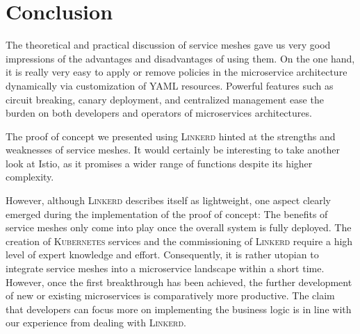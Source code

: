 \section{Conclusion}

The theoretical and practical discussion of service meshes gave us very good impressions of the advantages and disadvantages of using them.
On the one hand, it is really very easy to apply or remove policies in the microservice architecture dynamically via customization of YAML resources. Powerful features such as circuit breaking, canary deployment, and centralized management ease the burden on both developers and operators of microservices architectures.

The proof of concept we presented using \textsc{Linkerd} hinted at the strengths and weaknesses of service meshes. It would certainly be interesting to take another look at Istio, as it promises a wider range of functions despite its higher complexity.

However, although \textsc{Linkerd} describes itself as lightweight, one aspect clearly emerged during the implementation of the proof of concept: The benefits of service meshes only come into play once the overall system is fully deployed. The creation of \textsc{Kubernetes} services and the commissioning of \textsc{Linkerd} require a high level of expert knowledge and effort. Consequently, it is rather utopian to integrate service meshes into a microservice landscape within a short time. However, once the first breakthrough has been achieved, the further development of new or existing microservices is comparatively more productive. The claim that developers can focus more on implementing the business logic is in line with our experience from dealing with \textsc{Linkerd}.